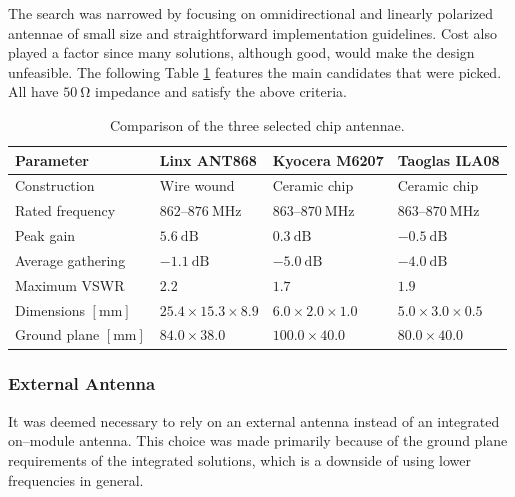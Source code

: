 The search was narrowed by focusing on omnidirectional and linearly polarized antennae of small size and straightforward implementation guidelines. Cost also played a factor since many solutions, although good, would make the design unfeasible. The following Table \ref{table:antenna-chip} features the main candidates that were picked. All have $50~\mathrm{\Omega}$ impedance and satisfy the above criteria.

\begin{table}
\begin{center}
\caption{\label{table:antenna-chip}Comparison of the three selected chip antennae.}
    \begin{tabular}{|l|l|l|l|} \hline
    \textbf{Parameter} & \textbf{Linx ANT868}\cite{linx_technologies_he_2024} & \textbf{Kyocera M6207}\cite{kyocera_ism_2024} & \textbf{Taoglas ILA08}\cite{taoglas_ila08_nodate} \\ \hline
    Construction & Wire wound & Ceramic chip & Ceramic chip \\ \hline
    Rated frequency                 & $862 \text{--} 876~\mathrm{MHz}$ & $863 \text{--} 870~\mathrm{MHz}$ & $863 \text{--} 870~\mathrm{MHz}$ \\ \hline
    Peak gain                       & $5.6~\mathrm{dB}$     & $0.3~\mathrm{dB}$     & $-0.5~\mathrm{dB}$ \\ \hline
    Average gathering               & $-1.1~\mathrm{dB}$    & $-5.0~\mathrm{dB}$    & $-4.0~\mathrm{dB}$ \\ \hline
    Maximum VSWR                    & $2.2$                 & $1.7$                 & $1.9$ \\ \hline
    Dimensions $\mathrm{[mm]}$      & $25.4 \times 15.3 \times 8.9$ & $6.0 \times 2.0 \times 1.0$ & $5.0 \times 3.0 \times 0.5$ \\ \hline
    Ground plane $\mathrm{[mm]}$    & $84.0 \times 38.0$ & $100.0 \times 40.0$ & $80.0 \times 40.0$ \\ \hline
    \end{tabular}
\end{center}
\end{table}

\subsubsection{External Antenna}
It was deemed necessary to rely on an external antenna instead of an integrated on--module antenna. This choice was made primarily because of the ground plane requirements of the integrated solutions, which is a downside of using lower frequencies in general.

